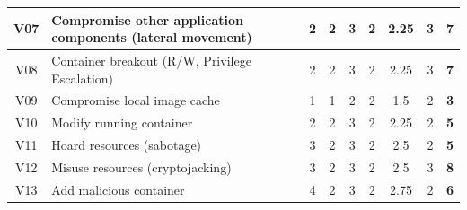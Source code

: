 \begin{landscape}
\begin{table}[]
{\begin{tabular}{|c|l|cccc|cc|c|}
V07             & Compromise other application components (lateral movement)                             & 2                                        & 2                              & 3                                        & 2                    & 2.25                                   & 3            & \textbf{7}           \\ \hline
V08             & Container breakout (R/W, Privilege Escalation)                                         & 2                                        & 2                              & 3                                        & 2                    & 2.25                                   & 3            & \textbf{7}           \\ \hline
V09             & Compromise local image cache                                                           & 1                                        & 1                              & 2                                        & 2                    & 1.5                                    & 2            & \textbf{3}           \\ \hline
V10             & Modify running container                                                               & 2                                        & 2                              & 3                                        & 2                    & 2.25                                   & 2            & \textbf{5}           \\ \hline
V11             & Hoard resources (sabotage)                                                             & 3                                        & 2                              & 3                                        & 2                    & 2.5                                    & 2            & \textbf{5}           \\ \hline
V12             & Misuse resources (cryptojacking)                                                       & 3                                        & 2                              & 3                                        & 2                    & 2.5                                    & 3            & \textbf{8}           \\ \hline
V13             & Add malicious container                                                                & 4                                        & 2                              & 3                                        & 2                    & 2.75                                   & 2            & \textbf{6}           \\ \hline

\end{tabular}}
\end{table}
\end{landscape}
